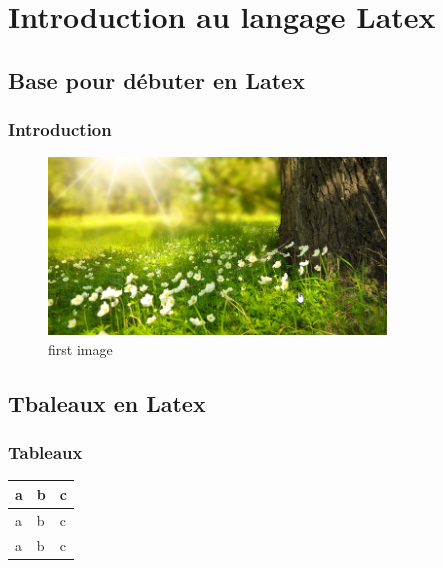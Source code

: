 \documentclass{report}
\begin{document}
\tableofcontents
\part{Introduction au langage Latex}
\chapter{Base pour débuter en Latex}
\section{Introduction}
\lipsum[1-2]
\begin{figure}
    \centering
    \includegraphics[width=0.8\textwidth]{nature.png}
    \caption{first image}
\end{figure}
\chapter{Tbaleaux en Latex}
\section{Tableaux}
\lipsum[1-2]
\begin{table}
    \centering
    \begin{tabular}{|l|l|l|}
        \hline
        a & b & c \\
        \hline
        a & b & c \\
        \hline
        a & b & c \\
        \hline
    \end{tabular}

\end{table}
\end{document}
